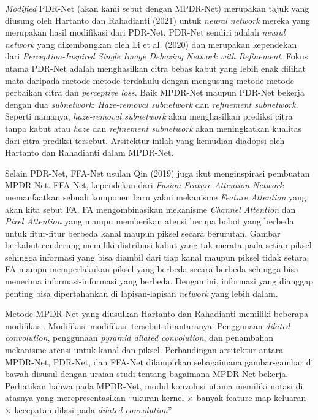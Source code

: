 \documentclass[11pt, a4paper, final]{report}
\begin{document}
\textit{Modified} PDR-Net (akan kami sebut dengan MPDR-Net) merupakan tajuk yang diusung oleh Hartanto dan Rahadianti (2021) untuk \textit{neural network} mereka yang merupakan hasil modifikasi dari PDR-Net. PDR-Net sendiri adalah \textit{neural network} yang dikembangkan oleh Li et al. (2020) dan merupakan kependekan dari \textit{Perception-Inspired Single Image Dehazing Network with Refinement}. Fokus utama PDR-Net adalah menghasilkan citra bebas kabut yang lebih enak dilihat mata daripada metode-metode terdahulu dengan mengusung metode-metode perbaikan citra dan \textit{perceptive loss}. Baik MPDR-Net maupun PDR-Net bekerja dengan dua \textit{subnetwork}: \textit{Haze-removal subnetwork} dan \textit{refinement subnetwork}. Seperti namanya, \textit{haze-removal subnetwork} akan menghasilkan prediksi citra tanpa kabut atau \textit{haze} dan \textit{refinement subnetwork} akan meningkatkan kualitas dari citra prediksi tersebut. Arsitektur inilah yang kemudian diadopsi oleh Hartanto dan Rahadianti dalam MPDR-Net.

Selain PDR-Net, FFA-Net usulan Qin (2019) juga ikut menginspirasi pembuatan MPDR-Net. FFA-Net, kependekan dari \textit{Fusion Feature Attention Network} memanfaatkan sebuah komponen baru yakni mekanisme \textit{Feature Attention} yang akan kita sebut FA. FA mengombinasikan mekanisme \textit{Channel Attention} dan \textit{Pixel Attention} yang mampu memberikan atensi berupa bobot yang berbeda untuk fitur-fitur berbeda kanal maupun piksel secara berurutan. Gambar berkabut cenderung memiliki distribusi kabut yang tak merata pada setiap piksel sehingga informasi yang bisa diambil dari tiap kanal maupun piksel tidak setara. FA mampu memperlakukan piksel yang berbeda secara berbeda sehingga bisa menerima informasi-informasi yang berbeda. Dengan ini, informasi yang dianggap penting bisa dipertahankan di lapisan-lapisan \textit{network} yang lebih dalam.

Metode MPDR-Net yang diusulkan Hartanto dan Rahadianti memiliki beberapa modifikasi. Modifikasi-modifikasi tersebut di antaranya: Penggunaan \textit{dilated convolution}, penggunaan \textit{pyramid dilated convolution}, dan penambahan mekanisme atensi untuk kanal dan piksel. Perbandingan arsitektur antara MPDR-Net, PDR-Net, dan FFA-Net dilampirkan sebagaimana gambar-gambar di bawah disusul dengan uraian studi tentang bagaimana MPDR-Net bekerja. Perhatikan bahwa pada MPDR-Net, modul konvolusi utama memiliki notasi di atasnya yang merepresentasikan “ukuran kernel $\times$
banyak feature map keluaran $\times$ kecepatan dilasi pada \textit{dilated convolution}”
\end{document}
